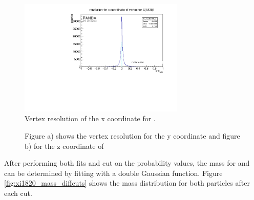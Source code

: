 	\begin{figure}
		\centering
		\includegraphics[width=0.7\textwidth]{./plots/Xi1820/XiMinus1820_vtxres_x.pdf}
		\caption{\propose Vertex resolution of the x coordinate for \excitedcascade.}
		\label{fig:Xi1820_vtxx}
	\end{figure}
	
	 \begin{figure}
		\centering
		\caption{\propose Figure a) shows the vertex resolution for the y coordinate and figure b) for the z coordinate of \excitedcascade}
		\label{fig:Xi1820_vtxyz}
	\end{figure}
	
	After performing both fits and cut on the probability values, the mass for \excitedcascade and \excitedanticascade
	can be determined by fitting with a double Gaussian function. 
	Figure \ref{fig:xi1820_mass_diffcuts} shows the mass distribution for both particles after each cut.
	
